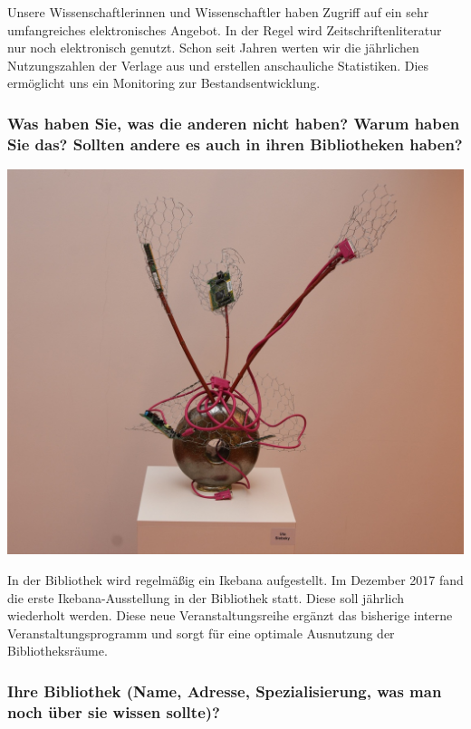 Unsere Wissenschaftlerinnen und Wissenschaftler haben Zugriff auf ein
sehr umfangreiches elektronisches Angebot. In der Regel wird
Zeitschriftenliteratur nur noch elektronisch genutzt. Schon seit Jahren
werten wir die jährlichen Nutzungszahlen der Verlage aus und erstellen
anschauliche Statistiken. Dies ermöglicht uns ein Monitoring zur
Bestandsentwicklung.

\hypertarget{was-haben-sie-was-die-anderen-nicht-haben-warum-haben-sie-das-sollten-andere-es-auch-in-ihren-bibliotheken-haben}{%
\subsubsection*{Was haben Sie, was die anderen nicht haben? Warum haben Sie
das? Sollten andere es auch in ihren Bibliotheken
haben?}\label{was-haben-sie-was-die-anderen-nicht-haben-warum-haben-sie-das-sollten-andere-es-auch-in-ihren-bibliotheken-haben}}

\begin{center}
\includegraphics{fhi/img/ikebana.jpg}
\end{center}

In der Bibliothek wird regelmäßig ein Ikebana aufgestellt. Im Dezember
2017 fand die erste Ikebana-Ausstellung in der Bibliothek statt. Diese
soll jährlich wiederholt werden. Diese neue Veranstaltungsreihe ergänzt
das bisherige interne Veranstaltungsprogramm und sorgt für eine optimale
Ausnutzung der Bibliotheksräume.

\hypertarget{ihre-bibliothek-name-adresse-spezialisierung-was-man-noch-uxfcber-sie-wissen-sollte}{%
\subsubsection*{Ihre Bibliothek (Name, Adresse, Spezialisierung, was man noch
über sie wissen
sollte)?}\label{ihre-bibliothek-name-adresse-spezialisierung-was-man-noch-uxfcber-sie-wissen-sollte}}


